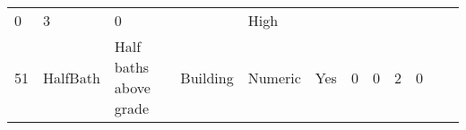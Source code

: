 \documentclass[11pt]{article}
\begin{document}
\begin{longtable}[]{@{}llllllllllll@{}}
\begin{minipage}[t]{0.04\columnwidth}
0\strut
\end{minipage} & \begin{minipage}[t]{0.04\columnwidth}\raggedright\strut
3\strut
\end{minipage} & \begin{minipage}[t]{0.04\columnwidth}\raggedright\strut
0\strut
\end{minipage} & \begin{minipage}[t]{0.04\columnwidth}\raggedright\strut
\strut
\end{minipage} & \begin{minipage}[t]{0.04\columnwidth}\raggedright\strut
High\strut
\end{minipage}\tabularnewline
\begin{minipage}[t]{0.04\columnwidth}\raggedright\strut
51\strut
\end{minipage} & \begin{minipage}[t]{0.04\columnwidth}\raggedright\strut
HalfBath\strut
\end{minipage} & \begin{minipage}[t]{0.04\columnwidth}\raggedright\strut
Half baths above grade\strut
\end{minipage} & \begin{minipage}[t]{0.04\columnwidth}\raggedright\strut
Building\strut
\end{minipage} & \begin{minipage}[t]{0.04\columnwidth}\raggedright\strut
Numeric\strut
\end{minipage} & \begin{minipage}[t]{0.04\columnwidth}\raggedright\strut
Yes\strut
\end{minipage} & \begin{minipage}[t]{0.04\columnwidth}\raggedright\strut
0\strut
\end{minipage} & \begin{minipage}[t]{0.04\columnwidth}\raggedright\strut
0\strut
\end{minipage} & \begin{minipage}[t]{0.04\columnwidth}\raggedright\strut
2\strut
\end{minipage} & \begin{minipage}[t]{0.04\columnwidth}\raggedright\strut
0\strut
\end{minipage} & \begin{minipage}[t]{0.04\columnwidth}\raggedright\strut
\strut
\end{minipage} & \begin{minipage}[t]{0.04\columnwidth}\raggedright\strut

\end{minipage}
\end{longtable}
\end{document}
